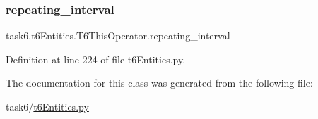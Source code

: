 \subsubsection{\texorpdfstring{repeating\+\_\+interval}{repeating\_interval}}
{\footnotesize\ttfamily task6.\+t6\+Entities.\+T6\+This\+Operator.\+repeating\+\_\+interval}



Definition at line 224 of file t6\+Entities.\+py.



The documentation for this class was generated from the following file\+:\begin{DoxyCompactItemize}
\item 
task6/\hyperlink{t6Entities_8py}{t6\+Entities.\+py}\end{DoxyCompactItemize}
